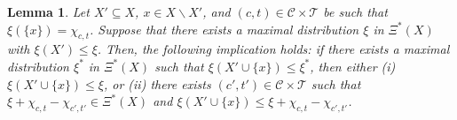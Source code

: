 \documentclass[12pt]{amsart}
\newtheorem{lemma}{Lemma}
\theoremstyle{remark}
\newcommand{\ky}[1]{{\color{violet} KY: #1 }}
\begin{document}
\begin{lemma} \label{lem:modified}
Let $X'\subseteq X$, $x\in X\backslash X'$, and $(c,t)\in \mathcal{C}\times \mathcal{T}$ be such that $\xi(\{x\})=\chi_{c,t}$. Suppose that
there exists a maximal distribution $\xi$ in $\Xi^*(X)$ with $\xi(X')\leq \xi$.
Then, the following implication holds: if there exists a maximal distribution $\xi^*$ in $\Xi^*(X)$ such that $\xi(X'\cup \{x\})\leq \xi^*$, then either (i) $\xi(X'\cup \{x\})\leq \xi$, or (ii) there exists $(c',t')\in \mathcal{C}\times \mathcal{T}$ such that $\xi+\chi_{c,t}-\chi_{c',t'}\in \Xi^*(X)$ and $\xi(X'\cup \{x\})\leq \xi+\chi_{c,t}-\chi_{c',t'} $.
\end{lemma}
\end{document}
